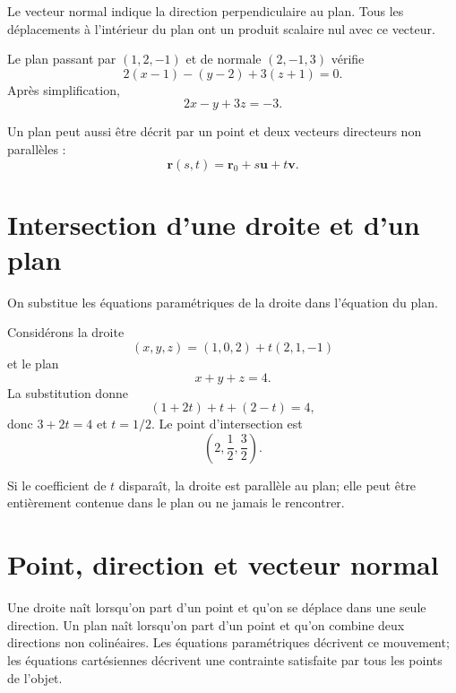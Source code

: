 \documentclass[12pt,a4paper,openany]{book}
\begin{document}
\begin{intuitionbox}
Le vecteur normal indique la direction perpendiculaire au plan. Tous les déplacements à l'intérieur du plan ont un produit scalaire nul avec ce vecteur.
\end{intuitionbox}

\begin{examplebox}
Le plan passant par $(1,2,-1)$ et de normale $(2,-1,3)$ vérifie
\[
2(x-1)-(y-2)+3(z+1)=0.
\]
Après simplification,
\[
2x-y+3z=-3.
\]
\end{examplebox}

Un plan peut aussi être décrit par un point et deux vecteurs directeurs non parallèles :
\[
\mathbf r(s,t)=\mathbf r_0+s\mathbf u+t\mathbf v.
\]

\section{Intersection d'une droite et d'un plan}

On substitue les équations paramétriques de la droite dans l'équation du plan.

\begin{examplebox}
Considérons la droite
\[
(x,y,z)=(1,0,2)+t(2,1,-1)
\]
et le plan
\[
x+y+z=4.
\]
La substitution donne
\[
(1+2t)+t+(2-t)=4,
\]
donc $3+2t=4$ et $t=1/2$. Le point d'intersection est
\[
\left(2,\frac12,\frac32\right).
\]
\end{examplebox}

Si le coefficient de $t$ disparaît, la droite est parallèle au plan; elle peut être entièrement contenue dans le plan ou ne jamais le rencontrer.


\section{Point, direction et vecteur normal}

\begin{visualbox}
Une droite naît lorsqu'on part d'un point et qu'on se déplace dans une seule direction. Un plan naît lorsqu'on part d'un point et qu'on combine deux directions non colinéaires. Les équations paramétriques décrivent ce mouvement; les équations cartésiennes décrivent une contrainte satisfaite par tous les points de l'objet.
\end{visualbox}
\end{document}
